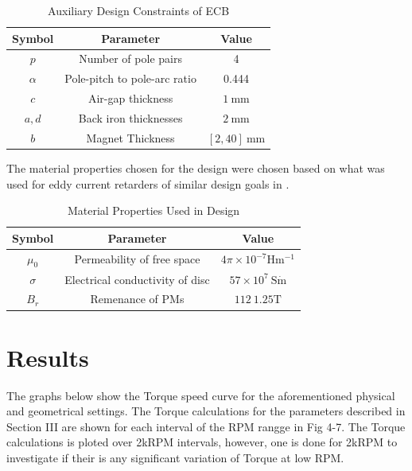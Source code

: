 \documentclass[lettersize,journal]{IEEEtran}
\begin{document}
\begin{table}[!t]
\renewcommand{\arraystretch}{1.3}
\caption{Auxiliary Design Constraints of ECB}
\label{table_example}
\centering
\begin{tabular}{c c c}
\hline
\bfseries Symbol & \bfseries Parameter & \bfseries Value\\
\hline
$p$ & Number of pole pairs &4\\
\hline
$\alpha$ & Pole-pitch to pole-arc ratio & 0.444\\
\hline
$c$ & Air-gap thickness &$1\ \mathrm{mm}$\\
\hline
$a,d$ & Back iron thicknesses &$2\ \mathrm{mm}$\\
\hline
$b$ & Magnet Thickness &$[2,40]\ \mathrm{mm}$\\
\hline
\end{tabular}
\end{table}

The material properties chosen for the design were chosen based on what was used for eddy current retarders of similar design goals in \cite{gay_2006_parametric}.


\begin{table}[!t]
\renewcommand{\arraystretch}{1.3}
\caption{Material Properties Used in Design}
\label{table_example}
\centering
\begin{tabular}{c c c}
\hline
\bfseries Symbol & \bfseries Parameter & \bfseries Value\\
\hline
$\mu_0$ & Permeability of free space &$4\pi \times 10^{-7} \mathrm{Hm^{-1}}$\\
\hline
$\sigma$ & Electrical conductivity of disc &$57 \times 10^{7}\ \mathrm{S\dot m}$\\
\hline
$B_r$ & Remenance of PMs &$112\ 1.25\mathrm{T}$\\
\hline
\end{tabular}
\end{table}

\section{Results}
The graphs below show the Torque speed curve for the aforementioned physical and geometrical settings. 
The Torque calculations for the parameters described in Section III are shown for each interval of the RPM rangge in Fig 4-7. The Torque calculations is ploted over 2kRPM intervals, however, one is done for 2kRPM to investigate if their is any significant variation of Torque at low RPM.
\end{document}
